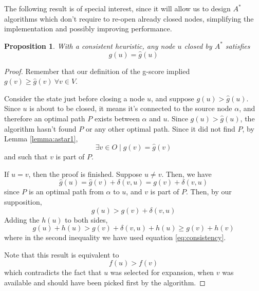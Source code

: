 \documentclass[12pt]{report}
\newtheorem{proposition}[theorem]{Proposition}
\begin{document}
The following result is of special interest, since it will allow us to design $A^*$ algorithms which don't require to re-open already closed nodes, simplifying the implementation and possibly improving performance.

\begin{proposition}
\label{prop:heur1}
With a consistent heuristic, any node $u$ closed by $A^*$ satisfies
\[ g(u) = \hat{g}(u) \]
\end{proposition}
\begin{proof}
Remember that our definition of the g-score implied $g(v) \geq \hat{g}(v) \ \forall v \in V$.

Consider the state just before closing a node $u$, and suppose $g(u) > \hat{g}(u)$. Since $u$ is about to be closed, it means it's connected to the source node $\alpha$, and therefore an optimal path $P$ exists between $\alpha$ and $u$. Since $g(u) > \hat{g}(u)$, the algorithm hasn't found $P$ or any other optimal path. Since it did not find $P$, by Lemma \ref{lemma:astar1},
\[ \exists v \in O \mid g(v) = \hat{g}(v) \]
and such that $v$ is part of $P$.

If $u = v$, then the proof is finished. Suppose $u \neq v$. Then, we have
\[ \hat{g}(u) = \hat{g}(v) + \delta(v, u) = g(v) + \delta(v, u) \]
since $P$ is an optimal path from $\alpha$ to $u$, and $v$ is part of $P$. Then, by our supposition,
\[ g(u) > g(v) + \delta(v, u) \]
Adding the $h(u)$ to both sides,
\[ g(u) + h(u) > g(v) + \delta(v, u) + h(u) \geq g(v) + h(v) \]
where in the second inequality we have used equation \ref{eq:consistency}.

Note that this result is equivalent to
\[ f(u) > f(v) \]
which contradicts the fact that $u$ was selected for expansion, when $v$ was available and should have been picked first by the algorithm.
\end{proof}
\end{document}
